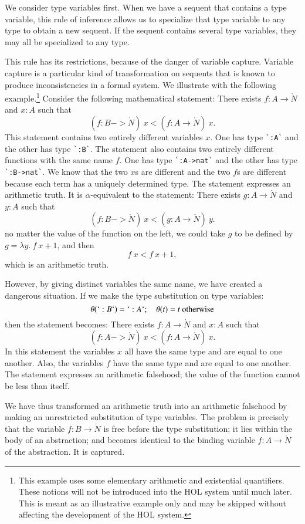 We consider type variables first.
When we have a sequent that contains a type variable, this rule of inference allows us to specialize that type variable to any type to obtain a new sequent.  If the sequent contains several type variables, they may all be specialized to any type.

This rule has its restrictions, because of the danger of variable capture.  Variable capture is a particular kind of transformation on sequents that is known to produce inconsistencies in a formal system.  We illustrate with the following example.\footnote{This example uses some elementary arithmetic and existential quantifiers.  These notions will not be introduced into the HOL system until much later.  This is meant as an illustrative example only and may be skipped without affecting the development of the HOL system.}  Consider the following mathematical statement: There exists $f:A\to\ring{N}$ and $x:A$ such that
$$
(f:B->\ring{N})~x < (f:A\to\ring{N})~x.
$$
This statement contains two entirely different variables $x$.  One has type \verb!`:A`! and the other has type \verb!`:B`!.  The statement also contains two entirely different functions with the same name $f$.  One has type \verb!`:A->nat`! and the other has type \verb!`:B->nat`!.  We know that the two $x$s are different and the two $f$s are different because each term has a uniquely determined type.  The statement expresses an arithmetic truth.  It is $\alpha$-equivalent to the statement: 
There exists $g:A\to\ring{N}$ and $y:A$ such that
$$
(f:B->\ring{N})~x < (g:A\to\ring{N})~y.
$$
no matter the value of the function on the left, we could take $g$ to be defined by $g = \lambda y.~f~x + 1$, and then
$$
f~x < f~x + 1,
$$
which is an arithmetic truth.

However, by giving distinct variables the same name, we have created a dangerous situation.  If we make the type substitution on type variables:
$$
\theta(`:B`) = `:A`;\quad \theta(t)=t\hbox{ otherwise}
$$
then the statement becomes:
There exists $f:A\to\ring{N}$ and $x:A$ such that
$$
(f:A->\ring{N})~x < (f:A\to\ring{N})~x.
$$
In this statement the variables $x$ all have the same type and are equal to one another.  Also, the variables $f$ have the same type and are equal to one another.  The statement expresses an arithmetic falsehood; the value of the function cannot be less than itself.

We have thus transformed an arithmetic truth into an arithmetic falsehood by making an unrestricted substitution of type variables.  The problem is precisely that the variable $f:B\to \ring{N}$ is free before the type substitution; it lies within the body of an abstraction; and becomes identical to the binding variable $f:A\to\ring{N}$ of the abstraction.  It is captured.


